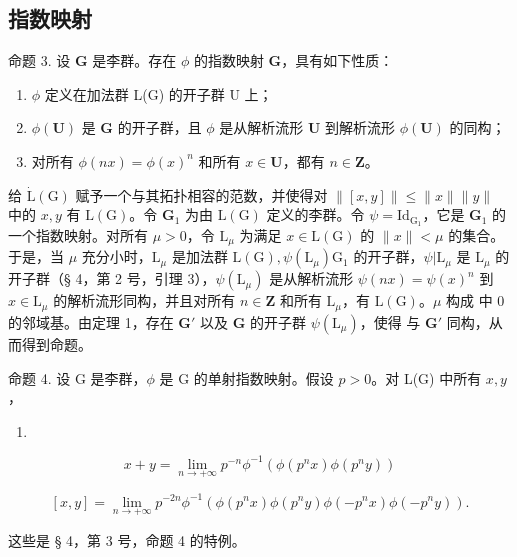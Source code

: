 \subsection{指数映射}

命题 3. 设 \(\mathbf{G}\) 是李群。存在 \(\phi\) 的指数映射 \(\mathbf{G}\)，具有如下性质：

\begin{enumerate}
\def\labelenumi{(\roman{enumi})}
\item
  \(\phi\) 定义在加法群 L(G) 的开子群 U 上；
\item
  \(\phi (\mathbf{U})\) 是 \(\mathbf{G}\) 的开子群，且 \(\phi\) 是从解析流形 \(\mathbf{U}\) 到解析流形 \(\phi (\mathbf{U})\) 的同构；
\item
  对所有 \(\phi(nx) = \phi(x)^n\) 和所有 \(x \in \mathbf{U}\)，都有 \(n \in \mathbf{Z}\)。
\end{enumerate}

给 \(\dot{\mathrm{L}}(\mathrm{G})\) 赋予一个与其拓扑相容的范数，并使得对 \(\| [x,y]\| \leqslant \| x\| \| y\|\) 中的 \(x,y\) 有 \(\mathrm{L}(\mathrm{G})\)。令 \(\mathbf{G}_1\) 为由 \(\mathrm{L}(\mathrm{G})\) 定义的李群。令 \(\psi = \mathrm{Id}_{\mathrm{G}_1}\)，它是 \(\mathbf{G}_1\) 的一个指数映射。对所有 \(\mu >0\)，令 \(\mathrm{L}_{\mu}\) 为满足 \(x\in \mathrm{L}(\mathrm{G})\) 的 \(\| x\| < \mu\) 的集合。于是，当 \(\mu\) 充分小时，\(\mathrm{L}_{\mu}\) 是加法群 \(\mathrm{L}(\mathrm{G}),\psi (\mathrm{L}_{\mu})\)\(\mathrm{G}_1\) 的开子群，\(\psi |\mathrm{L}_{\mu}\) 是 \(\mathrm{L}_{\mu}\) 的开子群（§ 4，第 2 号，引理 3），\(\psi (\mathrm{L}_{\mu})\) 是从解析流形 \(\psi (nx) = \psi (x)^n\) 到 \(x\in \mathrm{L}_{\mu}\) 的解析流形同构，并且对所有 \(n\in \mathbf{Z}\) 和所有 \(\mathrm{L}_{\mu}\)，有 \(\mathrm{L}(\mathrm{G})\)。\(\mu\) 构成  中 0 的邻域基。由定理 1，存在 \(\mathbf{G}'\) 以及 \(\mathbf{G}\) 的开子群 \(\psi (\mathrm{L}_{\mu})\)，使得  与 \(\mathbf{G}'\) 同构，从而得到命题。

命题 4. 设 G 是李群，\(\phi\) 是 G 的单射指数映射。假设 \(p > 0\)。对 L(G) 中所有 \(x, y\)，

\begin{enumerate}
\def\labelenumi{(\arabic{enumi})}
\tightlist
\item
\end{enumerate}

\[
x + y = \lim _ {n \rightarrow + \infty} p ^ {- n} \phi^ {- 1} (\phi (p ^ {n} x) \phi (p ^ {n} y))\tag{1}
\]

\[
[ x, y ] = \lim _ {n \rightarrow + \infty} p ^ {- 2 n} \phi^ {- 1} (\phi (p ^ {n} x) \phi (p ^ {n} y) \phi (- p ^ {n} x) \phi (- p ^ {n} y)).\tag{2}
\]

这些是 § 4，第 3 号，命题 4 的特例。

